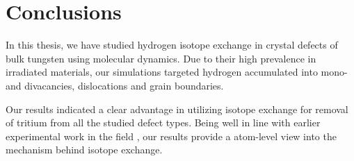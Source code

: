 \chapter{Conclusions}

In this thesis, we have studied hydrogen isotope exchange in crystal defects of bulk tungsten using molecular dynamics. 
Due to their high prevalence in irradiated materials, our simulations targeted hydrogen accumulated into mono- and divacancies, dislocations and grain boundaries.  

Our results indicated a clear advantage in utilizing isotope exchange for removal of tritium from all the studied defect types.
Being well in line with earlier experimental work in the field \cite{ahlgren2019hydrogen}, our results provide a atom-level view into the mechanism behind isotope exchange.